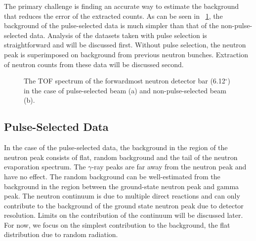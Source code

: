 The primary challenge is finding an accurate way to estimate the background that reduces the error of the extracted counts.  As can be seen in {\fig}~\ref{fig:PSvsNPS}, the background of the pulse-selected data is much simpler than that of the non-pulse-selected data.  Analysis of the datasets taken with pulse selection is straightforward and will be discussed first.  Without pulse selection, the neutron peak is superimposed on background from previous neutron bunches.  Extraction of neutron counts from these data will be discussed second.
\begin{figure}[!htbp]
\centering
{}
\caption{The TOF spectrum of the forwardmost neutron detector bar (6.12$^{\circ}$) in the case of pulse-selected beam (a) and non-pulse-selected beam (b).}
\label{fig:PSvsNPS}
\end{figure}

\subsection{Pulse-Selected Data}
In the case of the pulse-selected data, the background in the region of the neutron peak consists of flat, random background and the tail of the neutron evaporation spectrum.  The $\gamma$-ray peaks are far away from the neutron peak and have no effect.  The random background can be well-estimated from the background in the region between the ground-state neutron peak and gamma peak.  The neutron continuum is due to multiple direct reactions and can only contribute to the background of the ground state neutron peak due to detector resolution.  Limits on the contribution of the continuum will be discussed later.  For now, we focus on the simplest contribution to the background, the flat distribution due to random radiation.

